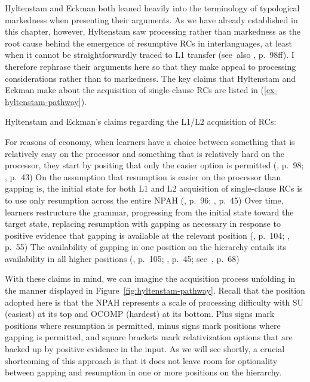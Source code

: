 Hyltenstam and Eckman both leaned heavily into the terminology of typological markedness when presenting their arguments. As we have already established in this chapter, however, Hyltenstam saw processing rather than markedness as the root cause behind the emergence of resumptive RCs in interlanguages, at least when it cannot be straightforwardly traced to L1 transfer (see~also \cite{eckman2004}, p.~98ff). I therefore rephrase their arguments here so that they make appeal to processing considerations rather than to markedness. The key claims that Hyltenstam and Eckman make about the acquisition of single-clause RCs are listed in (\ref{ex-hyltenstam-pathway}).

\pex\label{ex-hyltenstam-pathway} Hyltenstam and Eckman's claims regarding the L1/L2 acquisition of RCs:\par\nobreak
\a For reasons of economy, when learners have a choice between something that is relatively easy on the processor and something that is relatively hard on the processor, they start by positing that only the easier option is permitted (\cite{eckman2004}, p.~98; \cite{hyltenstam1984}, p.~43)
\a On the assumption that resumption is easier on the processor than gapping is, the initial state for both L1 and L2 acquisition of single-clause RCs is to use only resumption across the entire NPAH (\cite{eckman2004}, p.~96; \cite{hyltenstam1984}, p.~45)
\a Over time, learners restructure the grammar, progressing from the initial state toward the target state, replacing resumption with gapping as necessary in response to positive evidence that gapping is available at the relevant position (\cite{eckman2004}, p.~104; \cite{hyltenstam1984}, p.~55)
\a The availability of gapping in one position on the hierarchy entails its availability in all higher positions (\cite{eckman2004}, p.~105; \cite{hyltenstam1984}, p.~45; see~\cite{keenan.comrie1977}, p.~68)
\xe

\noindent With these claims in mind, we can imagine the acquisition process unfolding in the manner displayed in Figure~\ref{fig:hyltenstam-pathway}. Recall that the position adopted here is that the NPAH represents a scale of processing difficulty with SU (easiest) at its top and OCOMP (hardest) at its bottom. Plus signs mark positions where resumption is permitted, minus signs mark positions where gapping is permitted, and square brackets mark relativization options that are backed up by positive evidence in the input. As we will see shortly, a crucial shortcoming of this approach is that it does not leave room for optionality between gapping and resumption in one or more positions on the hierarchy.

